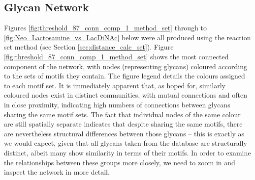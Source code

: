 \documentclass[12pt,a4paper]{article}
\begin{document}



\subsection{Glycan Network}
\label{sec:glycan_network}

Figures \ref{fig:threshold_87_conn_comp_1_method_set} through to \ref{fig:Neo_Lactosamine_vs_LacDiNAc} below were all produced using the reaction set method (see Section \ref{sec:distance_calc_set}). Figure \ref{fig:threshold_87_conn_comp_1_method_set} shows the most connected component of the network, with nodes (representing glycans) coloured according to the sets of motifs they contain. The figure legend details the colours assigned to each motif set. It is immediately apparent that, as hoped for, similarly coloured nodes exist in distinct communities, with mutual connections and often in close proximity, indicating high numbers of connections between glycans sharing the same motif sets. The fact that individual nodes of the same colour are still spatially separate indicates that despite sharing the same motifs, there are nevertheless structural differences between those glycans -- this is exactly as we would expect, given that all glycans taken from the database are structurally distinct, albeit many show similarity in terms of their motifs. In order to examine the relationships between these groups more closely, we need to zoom in and inspect the network in more detail.
\end{document}
